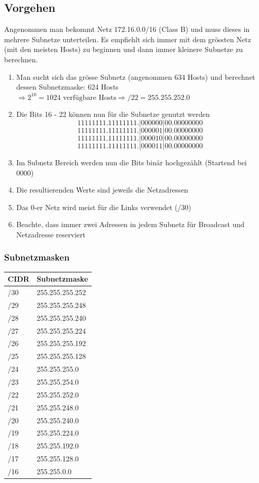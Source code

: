 \subsection{Vorgehen}
Angenommen man bekommt  Netz 172.16.0.0/16 (Class B) und muss dieses in mehrere Subnetze unterteilen. Es empfiehlt sich immer mit dem grössten Netz (mit den meisten Hosts) zu beginnen und dann immer kleinere Subnetze zu berechnen.	
\begin{enumerate}
	\item Man sucht sich das grösse Subnetz (angenommen 634 Hosts) und berechnet dessen Subnetzmaske: 624 Hosts $\Rightarrow 2^{10} = 1024 \text{ verfügbare Hosts} \Rightarrow /22 = 255.255.252.0$ 
	\item Die Bits 16 - 22 können nun für die Subnetze genutzt werden
	\[ 1111 1111 . 1111 1111 . |0000 00|00 . 0000 0000 \]
	\[ 1111 1111 . 1111 1111 . |0000 01|00 . 0000 0000 \]
	\[ 1111 1111 . 1111 1111 . |0000 10|00 . 0000 0000 \]
	\[ 1111 1111 . 1111 1111 . |0000 11|00 . 0000 0000 \]
	\item Im Subnetz Bereich werden nun die Bits binär hochgezählt (Startend bei 0000)
	\item Die resultierenden Werte sind jeweils die Netzadressen
	\item Das 0-er Netz wird meist für die Links verwendet (/30)
	\item Beachte, dass immer zwei Adressen in jedem Subnetz für Broadcast und Netzadresse reserviert
\end{enumerate}

\subsubsection{Subnetzmasken}
\begin{tabu} to \linewidth {|l|l|}
	\hline
	CIDR 	& Subnetzmaske\\ 
	\hline\hline
	/30 & 255.255.255.252 \\ \hline
	/29 & 255.255.255.248 \\ \hline
	/28 & 255.255.255.240 \\ \hline
	/27 & 255.255.255.224 \\ \hline
	/26 & 255.255.255.192 \\ \hline
	/25 & 255.255.255.128 \\ \hline
	/24 & 255.255.255.0 \\ \hline
	/23 & 255.255.254.0 \\ \hline
	/22 & 255.255.252.0 \\ \hline
	/21 & 255.255.248.0 \\ \hline
	/20 & 255.255.240.0 \\ \hline
	/19 & 255.255.224.0 \\ \hline
	/18 & 255.255.192.0 \\ \hline
	/17 & 255.255.128.0 \\ \hline
	/16 & 255.255.0.0 \\ \hline
\end{tabu}

